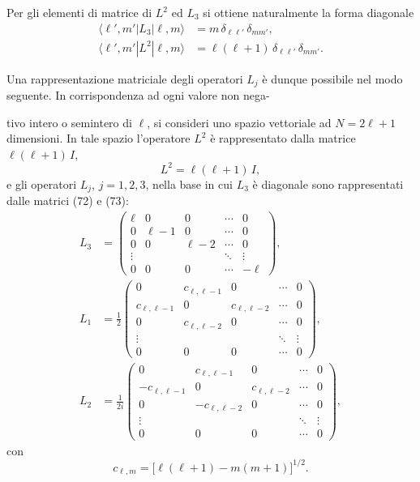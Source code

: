 \documentclass[11pt, a4paper]{book}
\numberwithin{equation}{section}
\begin{document}
Per gli elementi di matrice di $L^2$ ed $L_3$ si ottiene naturalmente la
forma diagonale
\begin{align}
\langle\ell',m'|L_3|\ell,m\rangle &= m\,\delta_{\ell\ell'}\,\delta_{mm'}, \tag{73} \\
\langle\ell',m'|L^2|\ell,m\rangle &= \ell(\ell+1)\,\delta_{\ell\ell'}\,\delta_{mm'}. \tag{74}
\end{align}

Una rappresentazione matriciale degli operatori $L_j$ è dunque possibile
nel modo seguente. In corrispondenza ad ogni valore non nega-


tivo intero o semintero di $\ell$, si consideri uno spazio vettoriale ad
$N = 2\ell+1$ dimensioni. In tale spazio l'operatore $L^2$ è rappresentato
dalla matrice $\ell(\ell+1)\,I$,
\begin{equation}
L^2 = \ell(\ell+1)\,I,
\end{equation}
e gli operatori $L_j$, $j=1,2,3$, nella base in cui $L_3$ è diagonale sono
rappresentati dalle matrici (72) e (73):
\begin{align}
L_3 &=
\begin{pmatrix}
\ell   & 0      & 0      & \cdots & 0      \\
0      & \ell-1 & 0      & \cdots & 0      \\
0      & 0      & \ell-2 & \cdots & 0      \\
\vdots &        &        & \ddots & \vdots \\
0      & 0      & 0      & \cdots & -\ell
\end{pmatrix}, \tag{76a} \\[6pt]
L_1 &= \tfrac{1}{2}
\begin{pmatrix}
0          & c_{\ell,\ell-1}   & 0             & \cdots & 0 \\
c_{\ell,\ell-1} & 0            & c_{\ell,\ell-2} & \cdots & 0 \\
0          & c_{\ell,\ell-2}   & 0             & \cdots & 0 \\
\vdots     &                   &               & \ddots & \vdots \\
0          & 0                 & 0             & \cdots & 0
\end{pmatrix}, \tag{76b} \\[6pt]
L_2 &= \tfrac{1}{2i}
\begin{pmatrix}
0               & c_{\ell,\ell-1}    & 0               & \cdots & 0 \\
-c_{\ell,\ell-1} & 0                 & c_{\ell,\ell-2} & \cdots & 0 \\
0               & -c_{\ell,\ell-2}   & 0               & \cdots & 0 \\
\vdots          &                    &                 & \ddots & \vdots \\
0               & 0                  & 0               & \cdots & 0
\end{pmatrix}, \tag{76c}
\end{align}
con
\begin{equation}
c_{\ell,m} = \bigl[\ell(\ell+1) - m(m+1)\bigr]^{1/2}.
\end{equation}
\end{document}
